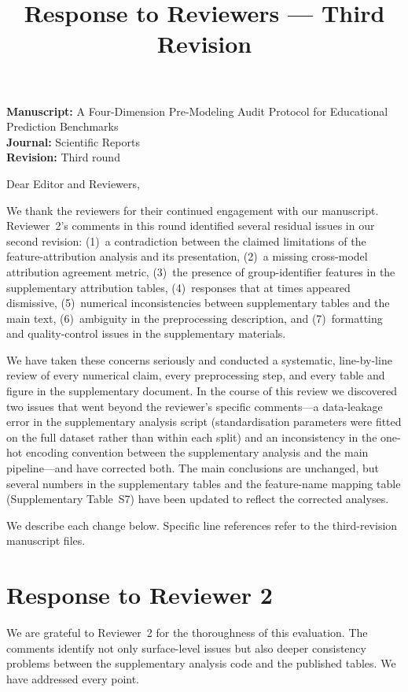 \documentclass[10pt,letterpaper]{article}
\title{\vspace*{-0.8in}\textbf{Response to Reviewers --- Third Revision}}
\author{}
\date{}
\begin{document}
\maketitle

\noindent\textbf{Manuscript:} A Four-Dimension Pre-Modeling Audit Protocol for Educational Prediction Benchmarks\\
\textbf{Journal:} Scientific Reports\\
\textbf{Revision:} Third round

\vspace{0.2in}
\noindent Dear Editor and Reviewers,

We thank the reviewers for their continued engagement with our manuscript.
Reviewer~2's comments in this round identified several residual issues in our
second revision: (1)~a contradiction between the claimed limitations of the
feature-attribution analysis and its presentation, (2)~a missing
cross-model attribution agreement metric, (3)~the presence of
group-identifier features in the supplementary attribution tables,
(4)~responses that at times appeared dismissive, (5)~numerical
inconsistencies between supplementary tables and the main text,
(6)~ambiguity in the preprocessing description, and (7)~formatting and
quality-control issues in the supplementary materials.

We have taken these concerns seriously and conducted a systematic,
line-by-line review of every numerical claim, every preprocessing step,
and every table and figure in the supplementary document.  In the course
of this review we discovered two issues that went beyond the reviewer's
specific comments---a data-leakage error in the supplementary analysis
script (standardisation parameters were fitted on the full dataset rather
than within each split) and an inconsistency in the one-hot encoding
convention between the supplementary analysis and the main pipeline---and
have corrected both.  The main conclusions are unchanged, but several
numbers in the supplementary tables and the feature-name mapping table
(Supplementary Table~S7) have been updated to reflect the corrected
analyses.

We describe each change below.  Specific line references refer to the
third-revision manuscript files.

\section*{Response to Reviewer 2}

We are grateful to Reviewer~2 for the thoroughness of this evaluation.
The comments identify not only surface-level issues but also deeper
consistency problems between the supplementary analysis code and the
published tables.  We have addressed every point.
\end{document}
